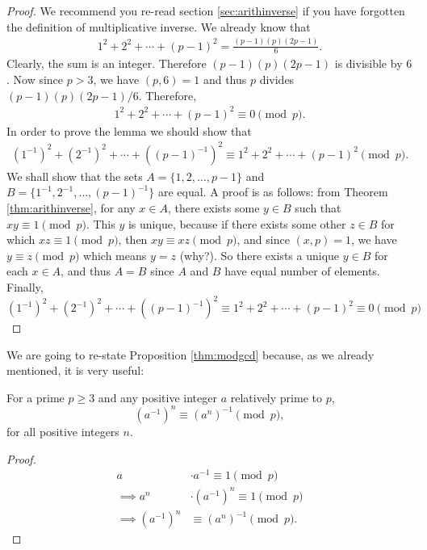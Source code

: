 \documentclass[12pt]{subfile}
\begin{document}
		\begin{proof}
			We recommend you re-read section \eqref{sec:arithinverse} if you have forgotten the definition of multiplicative inverse. We already know that
				\begin{align*}
					1^2+2^2+\cdots+(p-1)^2 = \frac{(p-1)(p)(2p-1)}{6}.
				\end{align*}
			Clearly, the sum is an integer. Therefore $(p-1)(p)(2p-1)$ is divisible by $6$. Now since $p>3$, we have $(p,6)=1$ and thus $p$ divides $(p-1)(p)(2p-1)/6$. Therefore,
				\begin{align*}
					1^2+2^2+\cdots+(p-1)^2 \equiv 0 \pmod p.
				\end{align*}
			In order to prove the lemma we should show that
				\begin{align*}
					(1^{-1})^2+(2^{-1})^2+\cdots+((p-1)^{-1})^2 \equiv 1^2+2^2+\cdots+(p-1)^2 \pmod p.
				\end{align*}
			We shall show that the sets $A=\{1,2,\ldots,p-1\}$ and $B=\{1^{-1}, 2^{-1},\ldots,(p-1)^{-1}\}$ are equal. A proof is as follows: from Theorem \ref{thm:arithinverse}, for any $x \in A$, there exists some $y \in B$ such that $xy \equiv 1 \pmod p$. This $y$ is unique, because if there exists some other $z \in B$ for which $xz \equiv 1 \pmod p$, then $xy \equiv xz \pmod p$, and since $(x,p)=1$, we have $y \equiv z \pmod p$ which means $y=z$ (why?). So there exists a unique $y\in B$ for each $x \in A$, and thus $A=B$ since $A$ and $B$ have equal number of elements. Finally,
				\begin{equation*}
					(1^{-1})^2+(2^{-1})^2+\cdots+((p-1)^{-1})^2 \equiv 1^2+2^2+\cdots+(p-1)^2 \equiv 0 \pmod p
				\end{equation*}
		\end{proof}
	We are going to re-state Proposition \ref{thm:modgcd} because, as we already mentioned, it is very useful:
		\begin{lemma}\label{lem:wolstproof3}
			For a prime $p\geq 3$ and any positive integer $a$ relatively prime to $p$,
			\[ (a^{-1})^n \equiv (a^n)^{-1} \pmod p,\]
			for all positive integers $n$.
		\end{lemma}

		\begin{proof}
			\begin{align*}
				a
					& \cdot a^{-1} \equiv 1 \pmod p\\
				\implies a^n
					& \cdot (a^{-1})^n \equiv 1 \pmod p\\
				\implies(a^{-1})^n
					& \equiv (a^n)^{-1} \pmod p.
			\end{align*}

		\end{proof}
\end{document}
